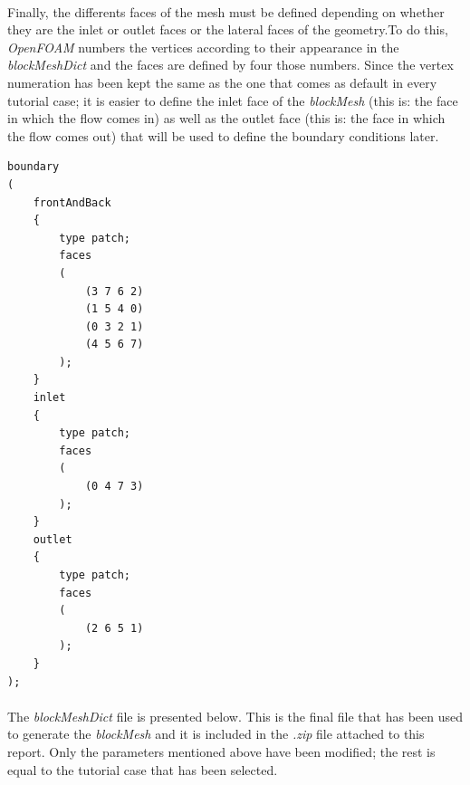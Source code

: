 \paragraph{}Finally, the differents faces of the mesh must be defined depending on whether they are the inlet or outlet faces or the lateral faces of the geometry.To do this, \textit{OpenFOAM} numbers the vertices according to their appearance in the \textit{blockMeshDict} and the faces are defined by four those numbers. Since the vertex numeration has been kept the same as the one that comes as default in every tutorial case; it is easier to define the inlet face of the \textit{blockMesh} (this is: the face in which the flow comes in) as well as the outlet face (this is: the face in which the flow comes out) that will be used to define the boundary conditions later.

\begin{footnotesize}
\begin{verbatim}
boundary
(
    frontAndBack
    {
        type patch;
        faces
        (
            (3 7 6 2)
            (1 5 4 0)
            (0 3 2 1)
            (4 5 6 7)
        );
    }
    inlet
    {
        type patch;
        faces
        (
            (0 4 7 3)
        );
    }
    outlet
    {
        type patch;
        faces
        (
            (2 6 5 1)
        );
    }
);
\end{verbatim}
\end{footnotesize}

\paragraph{}The \textit{blockMeshDict} file is presented below. This is the final file that has been used to generate the \textit{blockMesh} and it is included in the \textit{.zip} file attached to this report. Only the parameters mentioned above have been modified; the rest is equal to the tutorial case that has been selected.

